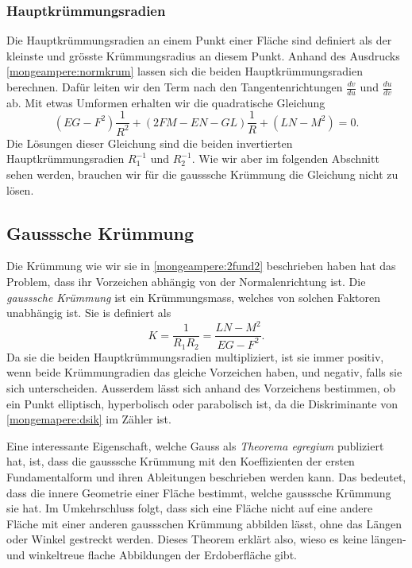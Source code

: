 \subsubsection{Hauptkrümmungsradien}
Die Hauptkrümmungsradien an einem Punkt einer Fläche sind definiert als der kleinste und grösste Krümmungsradius an diesem Punkt.
Anhand des Ausdrucks \eqref{mongeampere:normkrum} lassen sich die beiden Hauptkrümmungsradien berechnen.
Dafür leiten wir den Term nach den Tangentenrichtungen $\frac{d v}{d u}$ und $\frac{d u}{d v}$ ab.
Mit etwas Umformen erhalten wir die quadratische Gleichung
\begin{equation*}
  (EG - F^2)\frac{1}{R^2} + (2FM - EN - GL)\frac{1}{R} + (LN-M^2) = 0.
\end{equation*}
Die Lösungen dieser Gleichung sind die beiden invertierten Hauptkrümmungsradien $R_1^{-1}$ und $R_2^{-1}$.
Wie wir aber im folgenden Abschnitt sehen werden, brauchen wir für die gausssche Krümmung die Gleichung nicht 
zu lösen.

\subsection{Gausssche Krümmung}
Die Krümmung wie wir sie in \eqref{mongeampere:2fund2} beschrieben haben hat das Problem, dass
ihr Vorzeichen abhängig von der Normalenrichtung ist.
Die \emph{gausssche Krümmung} ist ein Krümmungsmass, welches von solchen Faktoren unabhängig ist.
%
Sie is definiert als 
\begin{equation}
  K = \frac{1}{R_1 R_2} = \frac{LN-M^2}{EG-F^2}.
  \label{mongeampere:gausskrumm}
\end{equation}
Da sie die beiden Hauptkrümmungsradien multipliziert, ist sie immer positiv, wenn 
beide Krümmungradien das gleiche Vorzeichen haben, und negativ, falls sie sich unterscheiden.
Ausserdem lässt sich anhand des Vorzeichens bestimmen, ob ein Punkt elliptisch, hyperbolisch oder parabolisch 
ist, da die Diskriminante von \eqref{mongemapere:dsik} im Zähler ist.

Eine interessante Eigenschaft, welche Gauss als \emph{Theorema egregium} publiziert hat, ist, dass
%
die gausssche Krümmung mit den Koeffizienten der ersten Fundamentalform und ihren Ableitungen beschrieben werden kann.
Das bedeutet, dass die innere Geometrie einer Fläche bestimmt, welche gausssche Krümmung sie hat.
Im Umkehrschluss folgt, dass sich eine Fläche nicht auf eine andere Fläche mit einer anderen gaussschen Krümmung abbilden
lässt, ohne das Längen oder Winkel gestreckt werden.
Dieses Theorem erklärt also, wieso es keine längen- und winkeltreue flache Abbildungen der Erdoberfläche gibt.

